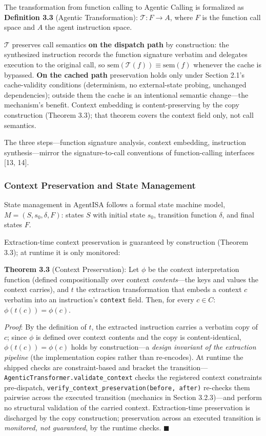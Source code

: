 \documentclass[
  sigconf,
  anonymous]{acmart}
\begin{document}
The transformation from function calling to Agentic Calling is
formalized as \textbf{Definition 3.3} (Agentic Transformation):
\(\mathcal{T}: F \rightarrow A\), where \(F\) is the function call space
and \(A\) the agent instruction space.

\(\mathcal{T}\) preserves call semantics \textbf{on the dispatch path}
by construction: the synthesized instruction records the function
signature verbatim and delegates execution to the original call, so
\(\text{sem}(\mathcal{T}(f)) \equiv \text{sem}(f)\) whenever the cache
is bypassed. \textbf{On the cached path} preservation holds only under
Section 2.1's cache-validity conditions (determinism, no external-state
probing, unchanged dependencies); outside them the cache is an
intentional semantic change---the mechanism's benefit. Context embedding
is content-preserving by the copy construction (Theorem 3.3); that
theorem covers the context field only, not call semantics.

The three steps---function signature analysis, context embedding,
instruction synthesis---mirror the signature-to-call conventions of
function-calling interfaces {[}13, 14{]}.

\subsubsection{Context Preservation and State
Management}\label{context-preservation-and-state-management}

State management in AgentISA follows a formal state machine model,
\(M = (S, s_0, \delta, F)\): states \(S\) with initial state \(s_0\),
transition function \(\delta\), and final states \(F\).

Extraction-time context preservation is guaranteed by construction
(Theorem 3.3); at runtime it is only monitored:

\textbf{Theorem 3.3} (Context Preservation): Let \(\phi\) be the context
interpretation function (defined compositionally over context
\emph{contents}---the keys and values the context carries), and \(t\)
the extraction transformation that embeds a context \(c\) verbatim into
an instruction's \texttt{context} field. Then, for every \(c \in C\):
\(\phi(t(c)) = \phi(c)\).

\emph{Proof}: By the definition of \(t\), the extracted instruction
carries a verbatim copy of \(c\); since \(\phi\) is defined over context
contents and the copy is content-identical, \(\phi(t(c)) = \phi(c)\)
holds by construction---a \emph{design invariant of the extraction
pipeline} (the implementation copies rather than re-encodes). At runtime
the shipped checks are constraint-based and bracket the
transition---\texttt{AgenticTransformer.validate\_context} checks the
registered context constraints pre-dispatch,
\texttt{verify\_context\_preservation(before,\ after)} re-checks them
pairwise across the executed transition (mechanics in Section
3.2.3)---and perform no structural validation of the carried context.
Extraction-time preservation is discharged by the copy construction;
preservation across an executed transition is \emph{monitored, not
guaranteed}, by the runtime checks. \(\blacksquare\)
\end{document}
